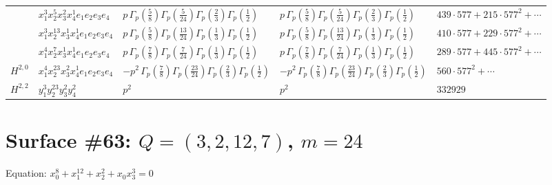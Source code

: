 \documentclass[11pt]{article}
\begin{document}
\begin{table}[ht]
{\begin{tabular}{@{}lllll@{}}
 & $x_{1}^{3} x_{2}^{5} x_{3}^{2} x_{4}^{1}  e_{1} e_{2} e_{3} e_{4}$ & $p \, \Gamma_p \left( \frac{5}{8} \right) \Gamma_p \left( \frac{5}{24} \right) \Gamma_p \left( \frac{2}{3} \right) \Gamma_p \left( \frac{1}{2} \right)$ & $p \, \Gamma_p \left( \frac{5}{8} \right) \Gamma_p \left( \frac{5}{24} \right) \Gamma_p \left( \frac{2}{3} \right) \Gamma_p \left( \frac{1}{2} \right)$ & $439{\cdot}577{+}215{\cdot}577^{2}{+}\cdots$ \\
 & $x_{1}^{3} x_{2}^{13} x_{3}^{1} x_{4}^{1}  e_{1} e_{2} e_{3} e_{4}$ & $p \, \Gamma_p \left( \frac{5}{8} \right) \Gamma_p \left( \frac{13}{24} \right) \Gamma_p \left( \frac{1}{3} \right) \Gamma_p \left( \frac{1}{2} \right)$ & $p \, \Gamma_p \left( \frac{5}{8} \right) \Gamma_p \left( \frac{13}{24} \right) \Gamma_p \left( \frac{1}{3} \right) \Gamma_p \left( \frac{1}{2} \right)$ & $410{\cdot}577{+}229{\cdot}577^{2}{+}\cdots$ \\
 & $x_{1}^{4} x_{2}^{7} x_{3}^{1} x_{4}^{1}  e_{1} e_{2} e_{3} e_{4}$ & $p \, \Gamma_p \left( \frac{7}{8} \right) \Gamma_p \left( \frac{7}{24} \right) \Gamma_p \left( \frac{1}{3} \right) \Gamma_p \left( \frac{1}{2} \right)$ & $p \, \Gamma_p \left( \frac{7}{8} \right) \Gamma_p \left( \frac{7}{24} \right) \Gamma_p \left( \frac{1}{3} \right) \Gamma_p \left( \frac{1}{2} \right)$ & $289{\cdot}577{+}445{\cdot}577^{2}{+}\cdots$ \\
\midrule
$H^{2,0}$ & $x_{1}^{4} x_{2}^{23} x_{3}^{2} x_{4}^{1}  e_{1} e_{2} e_{3} e_{4}$ & $- p^{2} \, \Gamma_p \left( \frac{7}{8} \right) \Gamma_p \left( \frac{23}{24} \right) \Gamma_p \left( \frac{2}{3} \right) \Gamma_p \left( \frac{1}{2} \right)$ & $- p^{2} \, \Gamma_p \left( \frac{7}{8} \right) \Gamma_p \left( \frac{23}{24} \right) \Gamma_p \left( \frac{2}{3} \right) \Gamma_p \left( \frac{1}{2} \right)$ & $560{\cdot}577^{2}{+}\cdots$ \\
\midrule
$H^{2,2}$ & $y_{1}^{3} y_{2}^{23} y_{3}^{2} y_{4}^{2}$ & $p^{2} \,$ & $p^{2} \,$ & $332929$ \\
\bottomrule
\end{tabular}
}
\renewcommand{\arraystretch}{1.0}
\end{table}

\newpage

\section*{Surface \#63: $Q=(3, 2, 12, 7)$, $m=24$}

Equation: $x_0^{8} + x_1^{12} + x_2^{2} + x_0 x_3^{3} = 0$
\end{document}
